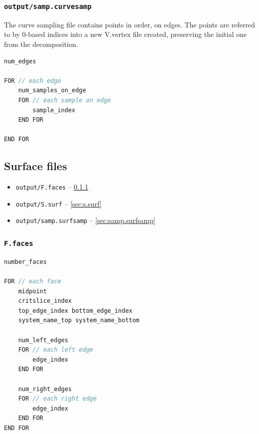 \subsubsection{\tt output/samp.curvesamp}
\label{sec:samp.curvesamp}

The curve sampling file contains points in order, on edges.  The points are referred to by 0-based indices into a new V.vertex file created, preserving the initial one from the decomposition.

\begin{center}\begin{minipage}{0.9\linewidth}
\begin{lstlisting}[language=c++, caption={\tt output/samp.curvesamp}, captionpos=b]
num_edges

FOR // each edge
	num_samples_on_edge
	FOR // each sample on edge
		sample_index
	END FOR

END FOR
\end{lstlisting}
\end{minipage}\end{center}






\clearpage
\subsection{Surface files}
\label{sec:surface_files}


\begin{itemize}
	\item {\tt output/F.faces} -- \ref{sec:f.faces}
	\item {\tt output/S.surf} -- \ref{sec:s.surf}
	\item {\tt output/samp.surfsamp} -- \ref{sec:samp.surfsamp}
\end{itemize}

\subsubsection{\tt F.faces}
\label{sec:f.faces}
\begin{center}\begin{minipage}{0.9\linewidth}
\begin{lstlisting}[language=c++, caption={\tt output/F.faces}, captionpos=b]
number_faces

FOR // each face
	midpoint
	critslice_index
	top_edge_index bottom_edge_index
	system_name_top system_name_bottom

	num_left_edges
	FOR // each left edge
		edge_index
	END FOR

	num_right_edges
	FOR // each right edge
		edge_index
	END FOR
END FOR
\end{lstlisting}
\end{minipage}\end{center}

